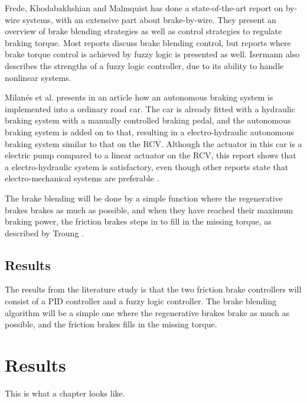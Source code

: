 \documentclass[a4paper,11pt]{kth-mag}
\begin{document}
Frede, Khodabakhshian and Malmquist \cite{Frede460614} has done a state-of-the-art report on by-wire systems, with an extensive part about brake-by-wire. They present an overview of brake blending strategies as well as control strategies to regulate braking torque. Most reports discuss brake blending control, but reports where  brake torque control is achieved by fuzzy logic is presented as well. Isermann \cite{661149} also describes the strengths of a fuzzy logic controller, due to its ability to handle nonlinear systems. \newline

Milan{\'e}s et al. \cite{milanes2010electro} presents in an article how an autonomous braking system is implemented into a ordinary road car. The car is already fitted with a hydraulic braking system with a manually controlled braking pedal, and the autonomous braking system is added on to that, resulting in a electro-hydraulic autonomous braking system similar to that on the RCV. 
Although the actuator in this car is a electric pump compared to a linear actuator on the RCV, this report shows that a electro-hydraulic system is satisfactory, even though other reports state that electro-mechanical systems are preferable \cite{MechatronicsBook} \cite{Xiang}. \newline

The brake blending will be done by a simple function where the regenerative brakes brakes as much as possible, and when they have reached their maximum braking power, the friction brakes steps in to fill in the missing torque, as described by Troung \cite{truongdevelopment}. \newline


\section*{Results}
The results from the literature study is that the two friction brake controllers will consist of a PID controller and a fuzzy logic controller. 
The brake blending algorithm will be a simple one where the regenerative brakes brake as much as possible, and the friction brakes fills in the missing torque. 



\chapter{Results}
This is what a chapter looks like.
\end{document}
